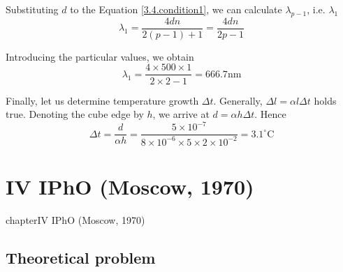 \documentclass[12pt,a4paper]{book}
\begin{document}
	Substituting $d$ to the Equation \ref{3.4.condition1}, we can calculate $\lambda_{p-1}$, i.e. $\lambda_1$
	\begin{equation*}
		\lambda_1=\frac{4dn}{2(p-1)+1}=\frac{4dn}{2p-1}
	\end{equation*}\par
	Introducing the particular values, we obtain
	\begin{equation*}
		\lambda_1=\frac{4\times500\times1}{2\times2-1}=666.7\text{nm}
	\end{equation*}\par
	Finally, let us determine temperature growth $\Delta t$. Generally, $\Delta l=\alpha l\Delta t$ holds true. Denoting the cube edge by $h$, we arrive at $d=\alpha h\Delta t$. Hence
	\begin{equation*}
		\Delta t=\frac{d}{\alpha h}=\frac{5\times10^{-7}}{8\times10^{-6}\times5\times2\times10^{-2}}=3.1^{\circ}\mathrm{C}
	\end{equation*}
\chapter*{IV IPhO (Moscow, 1970)}
{chapter}{IV IPhO (Moscow, 1970)}
\section*{Theoretical problem}
\end{document}

